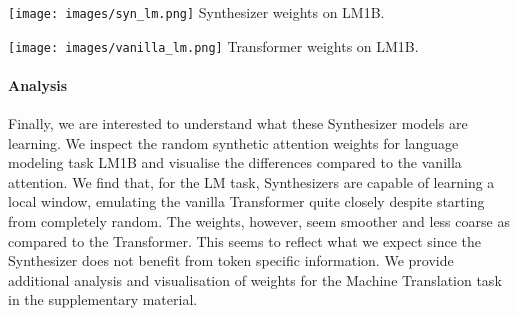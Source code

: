 \documentclass{article} \usepackage{iclr2021_conference,times}
\begin{document}
\begin{minipage}{0.2\linewidth}
 \centering
     \texttt{[image: images/syn\_lm.png]}
    \label{fig:synlm}
    Synthesizer weights on LM1B.
\end{minipage}
\begin{minipage}{0.2\linewidth}
 \centering
     \texttt{[image: images/vanilla\_lm.png]}
    \label{fig:synlm}
      Transformer weights on LM1B.
\end{minipage}
\begin{minipage}{0.62\linewidth}
\paragraph{Analysis} Finally, we are interested to understand what these Synthesizer models are learning. We inspect the random synthetic attention weights for language modeling task LM1B and visualise the differences compared to the vanilla attention. We find that, for the LM task, Synthesizers are capable of learning a local window, emulating the vanilla Transformer quite closely despite starting from completely random. The weights, however, seem smoother and less coarse as compared to the Transformer. This seems to reflect what we expect since the Synthesizer does not benefit from token specific information. We provide additional analysis and visualisation of weights for the Machine Translation task in the supplementary material.
\end{minipage}
\end{document}
